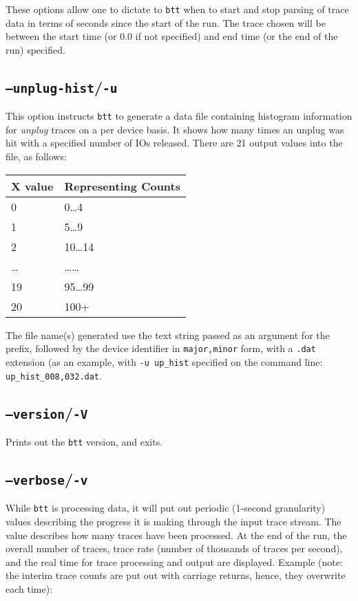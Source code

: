 \documentclass{article}
\begin{document}
  These options allow one to dictate to \texttt{btt} when to start and stop
  parsing of trace data in terms of seconds since the start of the run. The
  trace chosen will be between the start time (or 0.0 if not
  specified) and end time (or the end of the run) specified.

\subsection{\label{sec:o-u}\texttt{--unplug-hist}/\texttt{-u}}

  This option instructs \texttt{btt} to generate a data file containing
  histogram information for \emph{unplug} traces on a per device
  basis. It shows how many times an unplug was hit with a specified
  number of IOs released. There are 21 output values into the file, as
  follows:

  \medskip
  \begin{tabular}{ll}
\textbf{X value} & \textbf{Representing Counts} \\\hline
0 & 0\dots\/4 \\
1 & 5\dots\/9 \\
2 & 10\dots\/14 \\
\dots & \dots\dots\\
19 & 95\dots\/99 \\
20 & 100+ \\
  \end{tabular}

  \medskip
  The file name(s) generated use the text string passed as an argument for
  the prefix, followed by the device identifier in \texttt{major,minor}
  form, with a \texttt{.dat} extension (as an example, with \texttt{-u
  up\_hist} specified on the command line: \texttt{up\_hist\_008,032.dat}.

\subsection{\label{sec:o-V}\texttt{--version}/\texttt{-V}}

  Prints out the \texttt{btt} version, and exits.

\subsection{\label{sec:o-v}\texttt{--verbose}/\texttt{-v}}

  While \texttt{btt} is processing data, it will put out periodic (1-second
  granularity) values describing the progress it is making through the
  input trace stream. The value describes how many traces have been
  processed. At the end of the run, the overall number of traces, trace
  rate (number of thousands of traces per second), and the real time for
  trace processing and output are displayed. Example (note: the interim
  trace counts are put out with carriage returns, hence, they overwrite
  each time):
\end{document}
